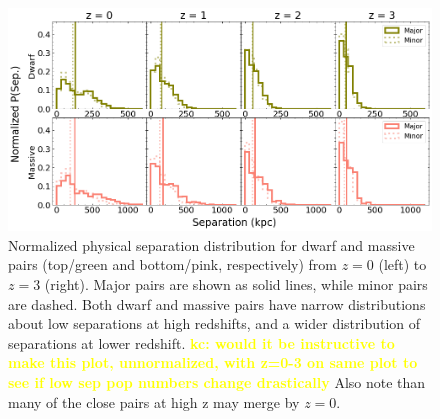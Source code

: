 \documentclass[twocolumn]{aastex631}
\newcommand{\kc}[1]{\textcolor{yellow}{\textbf{kc: #1}} }
\begin{document}
\begin{figure}[htb]
  \centering
  \includegraphics[width=\textwidth]{separation_distribution.png}
  \caption{Normalized physical separation distribution for dwarf and massive pairs (top/green and bottom/pink, respectively) from $z=0$ (left) to $z=3$ (right). Major pairs are shown as solid lines, while minor pairs are dashed. 
  Both dwarf and massive pairs have narrow distributions about low separations at high redshifts, and a wider distribution of separations at lower redshift. 
  \kc{would it be instructive to make this plot, unnormalized, with z=0-3 on same plot to see if low sep pop numbers change drastically}
  Also note than many of the close pairs at high z may merge by $z=0$. 
    }
  \label{fig:sep-dist}
\end{figure}
\end{document}
